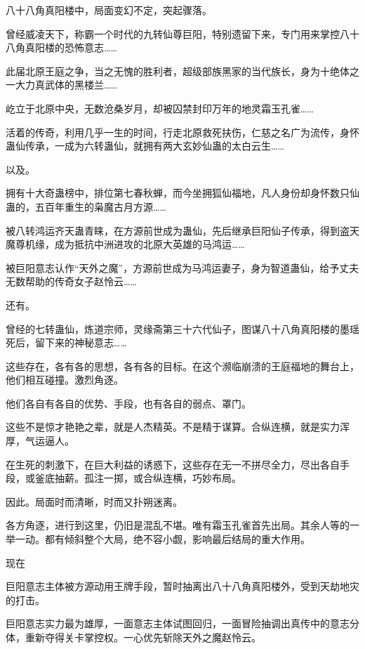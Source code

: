 
\begin{this_body}

八十八角真阳楼中，局面变幻不定，突起骤落。

曾经威凌天下，称霸一个时代的九转仙尊巨阳，特别遗留下来，专门用来掌控八十八角真阳楼的恐怖意志……

此届北原王庭之争，当之无愧的胜利者，超级部族黑家的当代族长，身为十绝体之一大力真武体的黑楼兰……

屹立于北原中央，无数沧桑岁月，却被囚禁封印万年的地灵霜玉孔雀……

活着的传奇，利用几乎一生的时间，行走北原救死扶伤，仁慈之名广为流传，身怀蛊仙传承，一成为六转蛊仙，就拥有两大玄妙仙蛊的太白云生……

以及。

拥有十大奇蛊榜中，排位第七春秋蝉，而今坐拥狐仙福地，凡人身份却身怀数只仙蛊的，五百年重生的枭魔古月方源……

被八转鸿运齐天蛊青睐，在方源前世成为蛊仙，先后继承巨阳仙子传承，得到盗天魔尊机缘，成为抵抗中洲进攻的北原大英雄的马鸿运……

被巨阳意志认作“天外之魔”，方源前世成为马鸿运妻子，身为智道蛊仙，给予丈夫无数帮助的传奇女子赵怜云……

还有。

曾经的七转蛊仙，炼道宗师，灵缘斋第三十六代仙子，图谋八十八角真阳楼的墨瑶死后，留下来的神秘意志……

这些存在，各有各的思想，各有各的目标。在这个濒临崩溃的王庭福地的舞台上，他们相互碰撞。激烈角逐。

他们各自有各自的优势、手段，也有各自的弱点、罩门。

这些不是惊才艳艳之辈，就是人杰精英。不是精于谋算。合纵连横，就是实力浑厚，气运逼人。

在生死的刺激下，在巨大利益的诱惑下，这些存在无一不拼尽全力，尽出各自手段，或釜底抽薪。孤注一掷，或合纵连横，巧妙布局。

因此。局面时而清晰，时而又扑朔迷离。

各方角逐，进行到这里，仍旧是混乱不堪。唯有霜玉孔雀首先出局。其余人等的一举一动。都有倾斜整个大局，绝不容小觑，影响最后结局的重大作用。

现在

巨阳意志主体被方源动用王牌手段，暂时抽离出八十八角真阳楼外，受到天劫地灾的打击。

巨阳意志实力最为雄厚，一面意志主体试图回归，一面冒险抽调出真传中的意志分体，重新夺得关卡掌控权。一心优先斩除天外之魔赵怜云。


\end{this_body}
